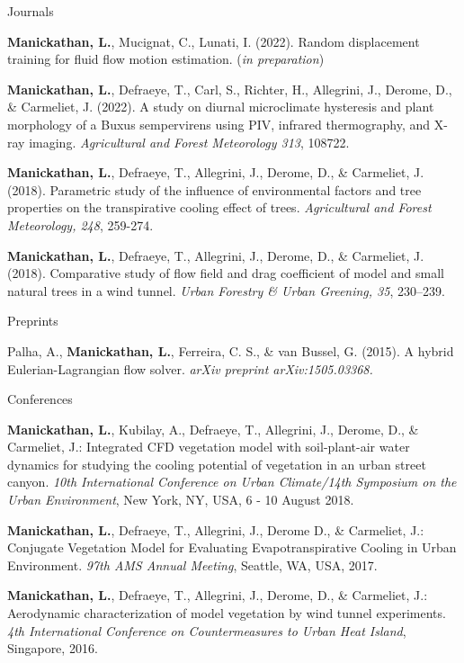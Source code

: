 \documentclass[11pt, a4paper]{awesome-cv}
\begin{document}
\begin{cventries}

  \pubentry
  {Journals} %
  {
    \begin{cvitems}
      \item {\textbf{Manickathan, L.}, Mucignat, C., Lunati, I. (2022). Random displacement training for fluid flow motion estimation. {\bodyfontlight(\textit{in preparation})}}
      \item {\textbf{Manickathan, L.}, Defraeye, T., Carl, S., Richter, H., Allegrini, J., Derome, D., \& Carmeliet, J. (2022). A study on diurnal microclimate hysteresis and plant morphology of a Buxus sempervirens using PIV, infrared thermography, and X-ray imaging. {\bodyfontlight\textit{Agricultural and Forest Meteorology 313}, 108722.}}
      \item {\textbf{Manickathan, L.}, Defraeye, T., Allegrini, J., Derome, D., \& Carmeliet, J. (2018). Parametric study of the influence of environmental factors and tree properties on the transpirative cooling effect of trees. {\bodyfontlight\textit{Agricultural and Forest Meteorology, 248}, 259-274.}}
      \item {\textbf{Manickathan, L.}, Defraeye, T., Allegrini, J., Derome, D., \& Carmeliet, J. (2018). Comparative study of flow field and drag coefficient of model and small natural trees in a wind tunnel. {\bodyfontlight\textit{Urban Forestry \& Urban Greening, 35}, 230–239.}}
    \end{cvitems}
  }

  \pubentry
  {Preprints}
  {
    \begin{cvitems}
      \item {Palha, A., \textbf{Manickathan, L.}, Ferreira, C. S., \& van Bussel, G. (2015). A hybrid Eulerian-Lagrangian flow solver. {\bodyfontlight\textit{arXiv preprint arXiv:1505.03368.}}}
    \end{cvitems}
  }

  \pubentry
  {Conferences}
  {
    \begin{cvitems}
      \item {\textbf{Manickathan, L.}, Kubilay, A., Defraeye, T., Allegrini, J., Derome, D., \& Carmeliet, J.: Integrated CFD vegetation model with soil-plant-air water dynamics for studying the cooling potential of vegetation in an urban street canyon. {\bodyfontlight\textit{10th International Conference on Urban Climate/14th Symposium on the Urban Environment}, New York, NY, USA, 6 - 10 August 2018.}}
      \item {\textbf{Manickathan, L.}, Defraeye, T., Allegrini, J., Derome D., \& Carmeliet, J.: Conjugate Vegetation Model for Evaluating Evapotranspirative Cooling in Urban Environment. {\bodyfontlight\textit{97th AMS Annual Meeting}, Seattle, WA, USA, 2017.}}
      \item {\textbf{Manickathan, L.}, Defraeye, T., Allegrini, J., Derome, D., \& Carmeliet, J.: Aerodynamic characterization of model vegetation by wind tunnel experiments. {\bodyfontlight\textit{4th International Conference on Countermeasures to Urban Heat Island}, Singapore, 2016.}}
    \end{cvitems}
  }

\end{cventries}
\end{document}
